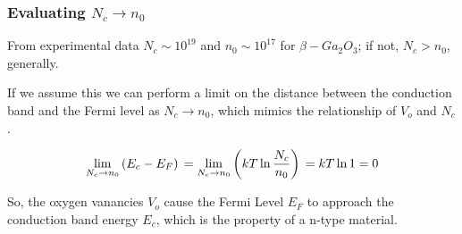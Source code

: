 \documentclass{article}
\begin{document}
\subsubsection{Evaluating \(N_c \to n_0\)}

From experimental data \(N_c \sim 10^{19}\) and \(n_0 \sim 10^{17}\) for \(\beta-Ga_2 O_3\); if not, \(N_c > n_0\), generally.

\smallskip

If we assume this we can perform a limit on the distance between the conduction band and the Fermi level as \(N_c \to n_0\), which mimics the relationship of \(V_o\) and \(N_c\).

\begin{equation} 
    \lim_{N_c \to n_0} \left( E_c - E_F \right) \\ 
    = \lim_{N_c \to n_0} \left( kT \ln \frac{N_c}{n_0} \right) \\
    = k T \ln 1 \\
    = 0 \\
\end{equation}

So, the oxygen vanancies \(V_o\) cause the Fermi Level \(E_F\) to approach the conduction band energy \(E_c\), which is the property of a n-type material.
\end{document}
